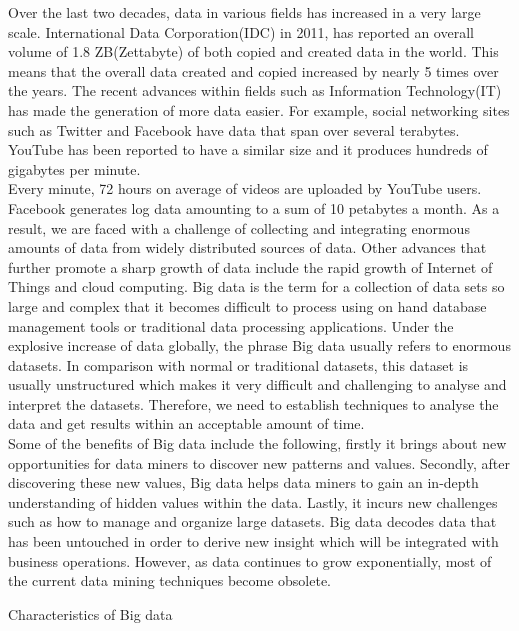 \documentclass[conference]{IEEEtran}
\begin{document}
Over the last two decades, data in various fields has increased in a very large scale. International Data Corporation(IDC) in 2011, has reported an overall volume of 1.8 ZB(Zettabyte) of both copied and created data in the world. This means that the overall data created and copied increased by nearly 5 times over the years. The recent advances within fields such as Information Technology(IT) has made the generation of more data easier. For example, social networking sites such as Twitter and Facebook have data that span over several terabytes. YouTube has been reported to have a similar size and it produces hundreds of gigabytes per minute. \\
Every minute, 72 hours on average of videos are uploaded by YouTube users. Facebook generates log data amounting to a sum of 10 petabytes a month. As a result, we are faced with a challenge of collecting and integrating enormous amounts of data from widely distributed sources of data. Other advances that further promote a sharp growth of data include the rapid growth of Internet of Things and cloud computing.
Big data is the term for a collection of data sets so large and complex that it becomes difficult to process using on hand database management tools or traditional data processing applications. Under the explosive increase of data globally, the phrase Big data usually refers to enormous datasets. In comparison with normal or traditional datasets, this dataset is usually unstructured which makes it very difficult and challenging to analyse and interpret the datasets. Therefore, we need to establish techniques to analyse the data and get results within an acceptable amount of time. \\

Some of the benefits of Big data include the following, firstly it brings about new opportunities for data miners to discover new patterns and values. Secondly, after discovering these new values, Big data helps data miners to gain an in-depth understanding of hidden values within the data. Lastly, it incurs new challenges such as how to manage and organize large datasets. Big data decodes data that has been untouched in order to derive new insight which will be integrated with business operations. However, as data continues to grow exponentially, most of the current data mining techniques become obsolete.



Characteristics of Big data \\
\end{document}
